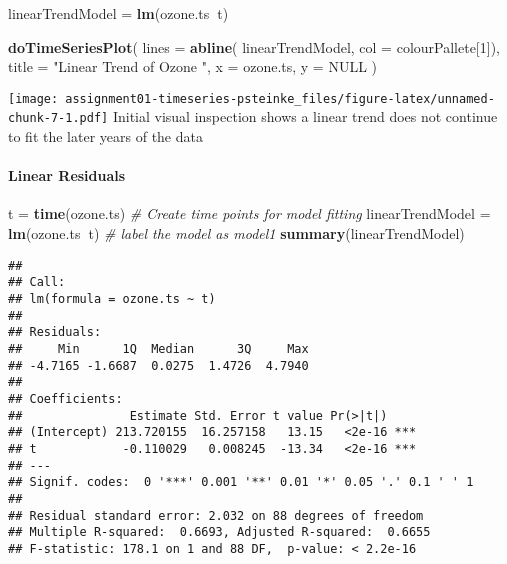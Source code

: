\documentclass[]{article}
\newenvironment{Shaded}{\begin{snugshade}}{\end{snugshade}}
\newcommand{\CommentTok}[1]{\textcolor[rgb]{0.56,0.35,0.01}{\textit{#1}}}
\newcommand{\DataTypeTok}[1]{\textcolor[rgb]{0.13,0.29,0.53}{#1}}
\newcommand{\DecValTok}[1]{\textcolor[rgb]{0.00,0.00,0.81}{#1}}
\newcommand{\KeywordTok}[1]{\textcolor[rgb]{0.13,0.29,0.53}{\textbf{#1}}}
\newcommand{\NormalTok}[1]{#1}
\newcommand{\OperatorTok}[1]{\textcolor[rgb]{0.81,0.36,0.00}{\textbf{#1}}}
\newcommand{\OtherTok}[1]{\textcolor[rgb]{0.56,0.35,0.01}{#1}}
\newcommand{\StringTok}[1]{\textcolor[rgb]{0.31,0.60,0.02}{#1}}
\let\oldparagraph\paragraph
\renewcommand{\paragraph}[1]{\oldparagraph{#1}\mbox{}}
\begin{document}
\begin{Shaded}
\begin{Highlighting}[]
\NormalTok{linearTrendModel =}\StringTok{ }\KeywordTok{lm}\NormalTok{(ozone.ts}\OperatorTok{~}\NormalTok{t)}
\end{Highlighting}
\end{Shaded}

\begin{Shaded}
\begin{Highlighting}[]
\KeywordTok{doTimeSeriesPlot}\NormalTok{(}
  \DataTypeTok{lines =} \KeywordTok{abline}\NormalTok{(}
\NormalTok{            linearTrendModel,}
            \DataTypeTok{col =}\NormalTok{ colourPallete[}\DecValTok{1}\NormalTok{]),}
  \DataTypeTok{title =} \StringTok{"Linear Trend of Ozone "}\NormalTok{,}
  \DataTypeTok{x =}\NormalTok{ ozone.ts,}
  \DataTypeTok{y =} \OtherTok{NULL}
\NormalTok{)}
\end{Highlighting}
\end{Shaded}

\texttt{[image: assignment01-timeseries-psteinke\_files/figure-latex/unnamed-chunk-7-1.pdf]}
Initial visual inspection shows a linear trend does not continue to fit
the later years of the data

\hypertarget{linear-residuals}{%
\paragraph{Linear Residuals}\label{linear-residuals}}

\begin{Shaded}
\begin{Highlighting}[]
\NormalTok{t =}\StringTok{ }\KeywordTok{time}\NormalTok{(ozone.ts) }\CommentTok{# Create time points for model fitting}
\NormalTok{linearTrendModel =}\StringTok{ }\KeywordTok{lm}\NormalTok{(ozone.ts}\OperatorTok{~}\NormalTok{t) }\CommentTok{# label the model as model1}
\KeywordTok{summary}\NormalTok{(linearTrendModel)}
\end{Highlighting}
\end{Shaded}

\begin{verbatim}
## 
## Call:
## lm(formula = ozone.ts ~ t)
## 
## Residuals:
##     Min      1Q  Median      3Q     Max 
## -4.7165 -1.6687  0.0275  1.4726  4.7940 
## 
## Coefficients:
##               Estimate Std. Error t value Pr(>|t|)    
## (Intercept) 213.720155  16.257158   13.15   <2e-16 ***
## t            -0.110029   0.008245  -13.34   <2e-16 ***
## ---
## Signif. codes:  0 '***' 0.001 '**' 0.01 '*' 0.05 '.' 0.1 ' ' 1
## 
## Residual standard error: 2.032 on 88 degrees of freedom
## Multiple R-squared:  0.6693, Adjusted R-squared:  0.6655 
## F-statistic: 178.1 on 1 and 88 DF,  p-value: < 2.2e-16
\end{verbatim}
\end{document}
